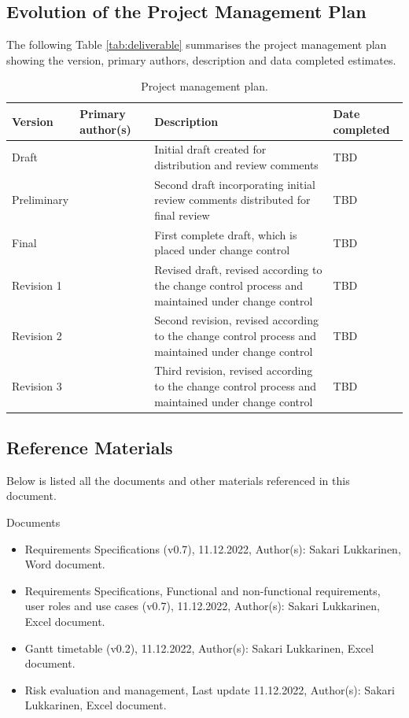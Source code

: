 \documentclass{article}
\begin{document}
\subsection{Evolution of the Project Management Plan}
The following Table \ref{tab:deliverable} summarises the project management plan showing the
version, primary authors, description and data completed estimates.

\begin{table}[h]
\centering
\caption{Project management plan.}
\label{tab:project_management_plan}
\begin{tabular}{|l|p{2cm}|p{7cm}|p{2cm}|}
\hline
\textbf{Version} & \textbf{Primary author(s)} & \textbf{Description} & \textbf{Date completed} \\
\hline
Draft & & Initial draft created for distribution and review comments & TBD \\
\hline
Preliminary & & Second draft incorporating initial review comments distributed for final review & TBD \\
\hline
Final & & First complete draft, which is placed under change control & TBD \\
\hline
Revision 1 & & Revised draft, revised according to the change control process and maintained under change control & TBD \\
\hline
Revision 2 & & Second revision, revised according to the change control process and maintained under change control & TBD \\
\hline
Revision 3 & & Third revision, revised according to the change control process and maintained under change control & TBD \\
\hline
\end{tabular}
\end{table}

\subsection{Reference Materials}
Below is listed all the documents and other materials referenced in this document.

Documents
\begin{itemize}
\item Requirements Specifications (v0.7), 11.12.2022, Author(s): Sakari Lukkarinen, Word document.
\item Requirements Specifications, Functional and non-functional requirements, user roles and use cases (v0.7), 11.12.2022, Author(s): Sakari Lukkarinen, Excel document.
\item Gantt timetable (v0.2), 11.12.2022, Author(s): Sakari Lukkarinen, Excel document.
\item Risk evaluation and management, Last update 11.12.2022, Author(s): Sakari Lukkarinen, Excel document.
\end{itemize}
\end{document}
